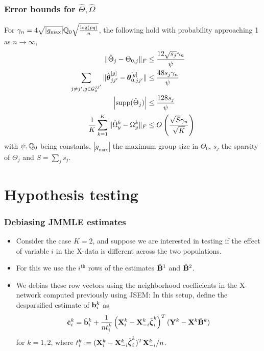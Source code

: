 \documentclass[10pt]{beamer}
\theoremstyle{definition}
\DeclareMathOperator*{\supp}{\text{supp}}
\begin{document}
\begin{frame}
\frametitle{Error bounds for $\hat \Theta, \hat\Omega$}

For $\gamma_n = 4 \sqrt{| g_{\max}|} {\mathbb{Q}}_0 \sqrt{ \frac{ \log(pq)}{n}}$, the following hold with probability approaching 1 as $n \rightarrow \infty$,
%
\begin{align*}
\| \hat \Theta_j - \Theta_{0,j} \|_F & \leq \frac{12 \sqrt{s_j} \gamma_n}{\psi} \\
\sum_{j \neq j', g \in \cG_y^{jj'}} \| \hat \bftheta_{jj'}^{[g]} - \bftheta_{0,jj'}^{[g]} \| & \leq \frac{48 s_j \gamma_n}{\psi} \\
\left| \supp (\hat \Theta_j) \right| & \leq
\frac{128 s_j}{ \psi}\\
\frac{1}{K} \sum_{k=1}^K \| \hat \Omega_y^k - \Omega_y^k \|_F & \leq
O \left( \frac{\sqrt S \gamma_n }{\sqrt K} \right)\\
\end{align*}
%
with $\psi, {\mathbb{Q}}_0$ being constants, $| g_{\max} |$ the maximum group size in $\Theta_0$, $s_j$ the sparsity of $\Theta_j$ and $S = \sum_j s_j$.
\end{frame}

\section{Hypothesis testing}
\begin{frame}
\frametitle{Debiasing JMMLE estimates}

\begin{itemize}
\item Consider the case $K=2$, and suppose we are interested in testing if the effect of variable $i$ in the X-data is different across the two populations.
\vspace{1em}

\item For this we use the $i^{\text{th}}$ rows of the estimates $\hat {{\mathbf{B}}}^1$ and $\hat {{\mathbf{B}}}^2$.
\vspace{1em}

\item We debias these row vectors using the neighborhood coefficients in the X-network computed previously using JSEM:
%
In this setup, define the desparsified estimate of ${\bf{b}}_i^k$ as
%
\begin{align*}
\hat {{\bf{c}}}_i^k = \hat {{\bf{b}}}_i^k + \frac{1}{n t_i^k} \left( {\mathbf{X}}_i^k - {\mathbf{X}}_{-i}^k \hat {{\boldsymbol{\zeta}}}_i^k \right)^T
({\mathbf{Y}}^k - {\mathbf{X}}^k \hat {{\mathbf{B}}}^k )
\end{align*}
%
for $k = 1,2$, where $t_i^k := ( {\mathbf{X}}_i^k - {\mathbf{X}}_{-i}^k \hat {{\boldsymbol{\zeta}}}_i^k )^T {\mathbf{X}}_{-i}^k/n$.
\end{itemize}

\end{frame}
\end{document}
